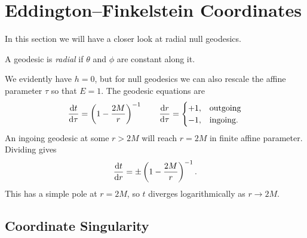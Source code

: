 \section{Eddington--Finkelstein Coordinates}%
\label{sec:eddington_finkelstein_coordinates}

In this section we will have a closer look at radial null geodesics.
\begin{definition}[radial]
  A geodesic is \emph{radial} if $\theta$ and $\phi$ are constant along it.
\end{definition}
We evidently have $h = 0$, but for null geodesics we can also rescale the affine parameter  $\tau$  so that $E = 1$. The geodesic equations are
 \begin{equation}
   \dv{t}{\tau} = \left( 1 - \frac{2M}{r} \right)^{-1} \qquad \dv{r}{\tau} = 
   \begin{cases}
     +1, & \text{outgoing} \\
     -1, & \text{ingoing}.
   \end{cases}
\end{equation}
An ingoing geodesic at some $r > 2M$ will reach  $r = 2M$ in finite affine parameter. Dividing gives
 \begin{equation}
   \dv{t}{r} = \pm \left( 1 - \frac{2M}{r} \right)^{-1}.
\end{equation}
This has a simple pole at $r = 2M$, so  $t$  diverges logarithmically as $r \to 2M$.

\subsection{Coordinate Singularity}%
\label{sub:coordinate_singularity}

